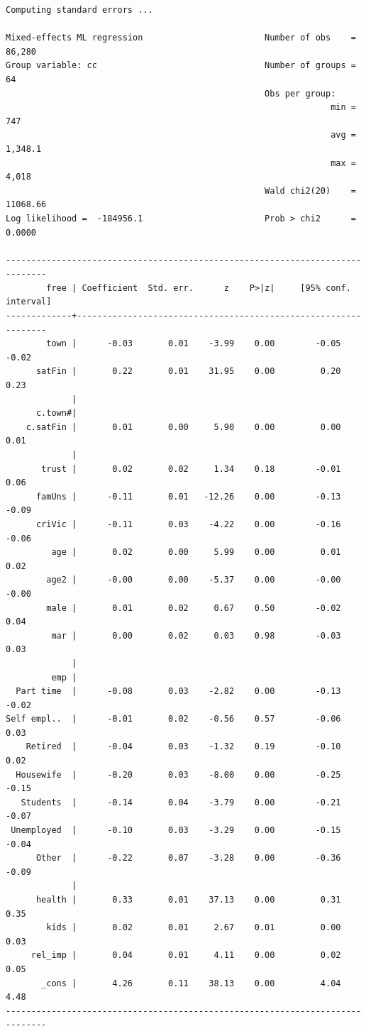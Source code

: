 \documentclass[10pt, letterpaper]{article}
\begin{document}
\begin{spacing}{1.4}
\begin{scriptsize}
\begin{spacing}{.19}
\begin{verbatim}
Computing standard errors ...

Mixed-effects ML regression                        Number of obs    =   86,280
Group variable: cc                                 Number of groups =       64
                                                   Obs per group:
                                                                min =      747
                                                                avg =  1,348.1
                                                                max =    4,018
                                                   Wald chi2(20)    = 11068.66
Log likelihood =  -184956.1                        Prob > chi2      =   0.0000

------------------------------------------------------------------------------
        free | Coefficient  Std. err.      z    P>|z|     [95% conf. interval]
-------------+----------------------------------------------------------------
        town |      -0.03       0.01    -3.99    0.00        -0.05       -0.02
      satFin |       0.22       0.01    31.95    0.00         0.20        0.23
             |
      c.town#|
    c.satFin |       0.01       0.00     5.90    0.00         0.00        0.01
             |
       trust |       0.02       0.02     1.34    0.18        -0.01        0.06
      famUns |      -0.11       0.01   -12.26    0.00        -0.13       -0.09
      criVic |      -0.11       0.03    -4.22    0.00        -0.16       -0.06
         age |       0.02       0.00     5.99    0.00         0.01        0.02
        age2 |      -0.00       0.00    -5.37    0.00        -0.00       -0.00
        male |       0.01       0.02     0.67    0.50        -0.02        0.04
         mar |       0.00       0.02     0.03    0.98        -0.03        0.03
             |
         emp |
  Part time  |      -0.08       0.03    -2.82    0.00        -0.13       -0.02
Self empl..  |      -0.01       0.02    -0.56    0.57        -0.06        0.03
    Retired  |      -0.04       0.03    -1.32    0.19        -0.10        0.02
  Housewife  |      -0.20       0.03    -8.00    0.00        -0.25       -0.15
   Students  |      -0.14       0.04    -3.79    0.00        -0.21       -0.07
 Unemployed  |      -0.10       0.03    -3.29    0.00        -0.15       -0.04
      Other  |      -0.22       0.07    -3.28    0.00        -0.36       -0.09
             |
      health |       0.33       0.01    37.13    0.00         0.31        0.35
        kids |       0.02       0.01     2.67    0.01         0.00        0.03
     rel_imp |       0.04       0.01     4.11    0.00         0.02        0.05
       _cons |       4.26       0.11    38.13    0.00         4.04        4.48
------------------------------------------------------------------------------


\end{verbatim}
\end{spacing}
\end{scriptsize}
\end{spacing}
\end{document}
